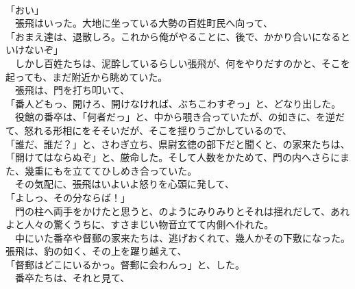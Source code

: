 \documentclass[
  paper=a5,
  fontsize=10pt,
  jafontsize=9.5pt,
  tate,                  %
  open_bracket_pos=nibu, %
]{jlreq}
\begin{document}
\\


「おい」\\


　張飛はいった。大地に坐っている大勢の百姓町民へ向って、\\


「おまえ達は、退散しろ。これから俺がやることに、後で、かかり合いになるといけないぞ」\\


　しかし百姓たちは、泥酔しているらしい張飛が、何をやりだすのかと、そこを起っても、まだ附近から眺めていた。\\


　張飛は、門を打ち叩いて、\\


「番人どもっ、開けろ、開けなければ、ぶちこわすぞっ」と、どなり出した。\\


　役館の番卒は、「何者だっ」と、中から覗き合っていたが、の如きに、を逆だて、怒れる形相にをそそいだが、そこを揺りうごかしているので、\\


「誰だ、誰だ？」と、さわぎ立ち、県尉玄徳の部下だと聞くと、の家来たちは、\\


「開けてはならぬぞ」と、厳命した。そして人数をかためて、門の内へさらにまた、幾重にもを立ててひしめき合っていた。\\


　その気配に、張飛はいよいよ怒りを心頭に発して、\\


「よしっ、その分ならば！」\\


　門の柱へ両手をかけたと思うと、のようにみりみりとそれは揺れだして、あれよと人々の驚くうちに、すさまじい物音立てて内側へ仆れた。\\


　中にいた番卒や督郵の家来たちは、逃げおくれて、幾人かその下敷になった。張飛は、豹の如く、その上を躍り越えて、\\


「督郵はどこにいるかっ。督郵に会わんっ」と、した。\\


　番卒たちは、それと見て、\\
\end{document}
